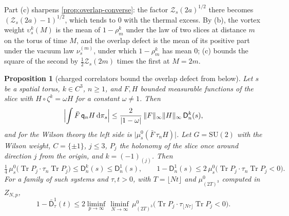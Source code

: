 \documentclass[11pt,a4paper]{amsart}
\newtheorem{proposition}[theorem]{Proposition}
\theoremstyle{definition}
\theoremstyle{remark}
\numberwithin{equation}{section}
\DeclareMathOperator{\Tr}{Tr}        %
\newcommand{\norm}[1]{\lVert #1\rVert}     %
\newcommand{\abs}[1]{\lvert #1\rvert}      %
\newcommand{\dd}{\,\mathrm{d}}             %
\newcommand{\SU}{\mathrm{SU}}              %
\newcommand{\TT}{\mathbb{T}}               %
\newcommand{\Zc}{\mathcal{Z}}              %
\newcommand{\Zs}[2]{\Zc_{#1}(#2)}          %
\newcommand{\cube}[1]{(2#1)^3}             %
\begin{document}
Part (c) sharpens \cref{prop:overlap-converse}: the factor $\Zs{s}{2a}^{1/2}$ there becomes $(\Zs{s}{2a}-1)^{1/2}$, which tends to $0$ with the thermal excess. By (b), the vortex weight $\upsilon^k_s(M)$ is the mean of $1-\rho^k_m$ under the law of two slices at distance $m$ on the torus of time $M$, and the overlap defect is the mean of its positive part under the vacuum law $\nu^{(m)}_s$, under which $1-\rho^k_m$ has mean $0$; (c) bounds the square of the second by $\frac12\Zs{s}{2m}$ times the first at $M=2m$.

\begin{proposition}[charged correlators bound the overlap defect from below]\label{prop:overlap-polyakov}
Let $s$ be a spatial torus, $k\in C^3$, $n\ge1$, and $F,H$ bounded measurable functions of the slice with $H\circ\zeta^k=\omega H$ for a constant $\omega\ne1$. Then
\[
\Bigl\lvert\int\bar F\,\mathsf q_nH\dd\pi_s\Bigr\rvert\le\frac2{\abs{1-\omega}}\,\norm F_\infty\norm H_\infty\,\mathsf D^k_n(s),
\]
and for the Wilson theory the left side is $\abs{\mu^0_s(\bar F\,\tau_nH)}$. Let $G=\SU(2)$ with the Wilson weight, $C=\{\pm1\}$, $j\le3$, $P_j$ the holonomy of the slice once around direction $j$ from the origin, and $k=(-1)_{(j)}$. Then
\[
\tfrac14\,\mu^0_s\bigl(\Tr P_j\cdot\tau_n\Tr P_j\bigr)\le\mathsf D^k_n(s)\le\mathsf D^1_n(s),\qquad 1-\mathsf D^1_n(s)\le2\,\mu^0_s\bigl(\Tr P_j\cdot\tau_n\Tr P_j<0\bigr).
\]
For a family of such systems and $\tau,t>0$, with $T=\lfloor Nt\rfloor$ and $\mu^0_{\cube T}$ computed in $Z_{N,p}$,
\[
1-\bar{\mathsf D}^1_\tau(t)\le2\liminf_{p\to\infty}\,\liminf_{N\to\infty}\,\mu^0_{\cube T}\bigl(\Tr P_j\cdot\tau_{\lfloor N\tau\rfloor}\Tr P_j<0\bigr).
\]
\end{proposition}
\end{document}
